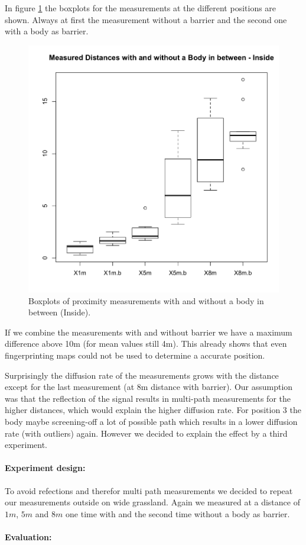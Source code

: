  In figure \ref{fig:proxWithB1} the boxplots for the measurements at the different positions are shown. Always at first the measurement without a barrier and the second one with a body as barrier. 

\begin{figure}[h]
	\centering
		\includegraphics[width=.5\textwidth]{images/insideProx.png}
	\caption{Boxplots of proximity measurements with and without a body in between (Inside).}
	\label{fig:proxWithB1}
\end{figure}

 If we combine the measurements with and without barrier we have a maximum difference above 10m (for mean values still 4m). This already shows that even fingerprinting maps could not be used to determine a accurate position. 

 Surprisingly the diffusion rate of the measurements grows with the distance except for the last measurement (at 8m distance with barrier). Our assumption was that the reflection of the signal results in multi-path measurements for the higher distances, which would explain the higher diffusion rate. For position 3 the body maybe screening-off  a lot of possible path which results in a lower diffusion rate (with outliers) again. 
 However we decided to explain the effect by a third experiment.  

\paragraph{Experiment design: }
To avoid refections and therefor multi path measurements we decided to repeat our measurements outside on wide grassland. 
Again we measured at a distance of $1m$, $5m$ and $8m$ one time with and the second time without a body as barrier.

\paragraph{Evaluation: }

